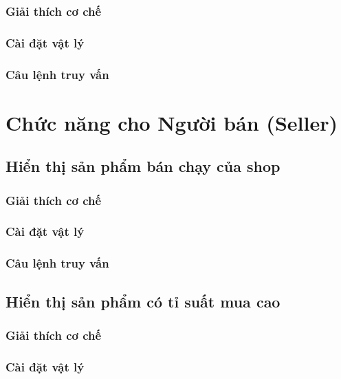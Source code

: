 \subsubsection{Giải thích cơ chế}

\subsubsection{Cài đặt vật lý}

\subsubsection{Câu lệnh truy vấn}

\section{Chức năng cho Người bán (Seller)}

\subsection{Hiển thị sản phẩm bán chạy của shop}

\subsubsection{Giải thích cơ chế}

\subsubsection{Cài đặt vật lý}

\subsubsection{Câu lệnh truy vấn}

\subsection{Hiển thị sản phẩm có tỉ suất mua cao}

\subsubsection{Giải thích cơ chế}

\subsubsection{Cài đặt vật lý}

